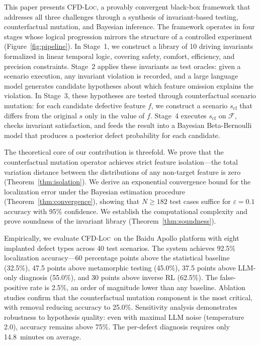 \documentclass[journal]{IEEEtran}
\theoremstyle{plain}
\newcommand{\methodname}{\textsc{CFD-Loc}}
\newcommand{\sys}{\mathcal{F}}
\begin{document}
This paper presents \methodname, a provably convergent black-box framework that addresses all three challenges through a synthesis of invariant-based testing, counterfactual mutation, and Bayesian inference. The framework operates in four stages whose logical progression mirrors the structure of a controlled experiment (Figure~\ref{fig:pipeline}). In Stage~1, we construct a library of 10 driving invariants formalized in linear temporal logic, covering safety, comfort, efficiency, and precision constraints. Stage~2 applies these invariants as test oracles: given a scenario execution, any invariant violation is recorded, and a large language model generates candidate hypotheses about which feature omission explains the violation. In Stage~3, these hypotheses are tested through counterfactual scenario mutation: for each candidate defective feature $f$, we construct a scenario $s_{\text{cf}}$ that differs from the original $s$ only in the value of $f$. Stage~4 executes $s_{\text{cf}}$ on $\sys$, checks invariant satisfaction, and feeds the result into a Bayesian Beta-Bernoulli model that produces a posterior defect probability for each candidate.

The theoretical core of our contribution is threefold. We prove that the counterfactual mutation operator achieves strict feature isolation---the total variation distance between the distributions of any non-target feature is zero (Theorem~\ref{thm:isolation}). We derive an exponential convergence bound for the localization error under the Bayesian estimation procedure (Theorem~\ref{thm:convergence}), showing that $N \geq 182$ test cases suffice for $\varepsilon=0.1$ accuracy with 95\% confidence. We establish the computational complexity and prove soundness of the invariant library (Theorem~\ref{thm:soundness}).

Empirically, we evaluate \methodname\ on the Baidu Apollo platform with eight implanted defect types across 40 test scenarios. The system achieves 92.5\% localization accuracy---60 percentage points above the statistical baseline (32.5\%), 47.5 points above metamorphic testing (45.0\%), 37.5 points above LLM-only diagnosis (55.0\%), and 30 points above inverse RL (62.5\%). The false-positive rate is 2.5\%, an order of magnitude lower than any baseline. Ablation studies confirm that the counterfactual mutation component is the most critical, with removal reducing accuracy to 25.0\%. Sensitivity analysis demonstrates robustness to hypothesis quality: even with maximal LLM noise (temperature 2.0), accuracy remains above 75\%. The per-defect diagnosis requires only 14.8~minutes on average.
\end{document}
